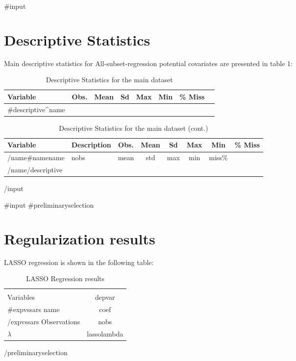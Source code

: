 \documentclass{article}
\begin{document}
{{#input}}
\section{Descriptive Statistics}

Main descriptive statistics for All-subset-regression potential covariates are presented in table 1:

\begin{table}[!h]
  \centering
  \caption{Descriptive Statistics for the main dataset}
    \begin{tabular}{|p{2cm}|c|c|c|c|c|c|c|}
    \hline
    Variable & Obs. & Mean & Sd & Max & Min & \% Miss \\
    \hline
    \hline
    {{#descriptive}}{{^name}}
    \hline
    \end{tabular}
\end{table}

\begin{table}[!h]
  \centering
  \caption{Descriptive Statistics for the main dataset (cont.)}
    \begin{tabular}{|p{2cm}|p{4cm}|c|c|c|c|c|c|}
    \hline
    Variable & Description & Obs. & Mean & Sd & Max & Min & \% Miss \\
    \hline
    \hline
    {{/name}}{{#name}}{{name}} & {{nobs}} & {{mean}} & {{std}} & {{max}} & {{min}} & {{miss}}\% \\ 
    {{/name}}{{/descriptive}}\hline
    \end{tabular}
\end{table}
{{/input}}

{{#input}}
{{#preliminaryselection}}
\section{Regularization results}

LASSO regression is shown in the following table:

\begin{table}[!h]
  \centering
  \caption{LASSO Regression results}
    \begin{tabular}{l c}
    \hline
    \hline
              & \\
    Variables & {{depvar}} \\
    \hline
    \hline
    {{#expvssars}}
      {{name}} & {{coef}} \\
    {{/expvssars}}
    \hline
    \hline
    Observations &  {{nobs}} \\
    $\lambda$      &  {{lassolambda}} \\
    \hline
    \end{tabular}
\end{table}
{{/preliminaryselection}}
\end{document}
